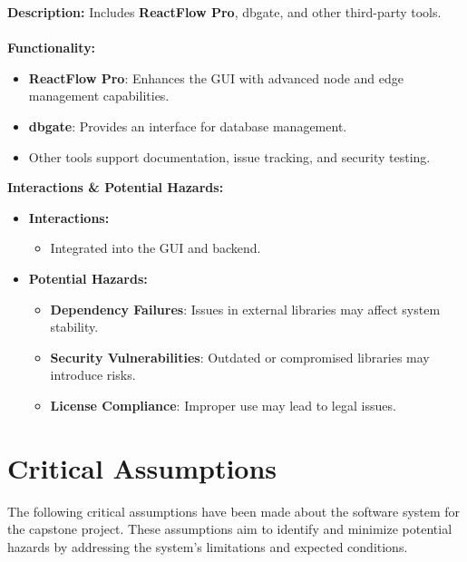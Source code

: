 \documentclass{article}
\begin{document}
\textbf{Description:}
Includes \textbf{ReactFlow Pro}, dbgate, and other third-party tools.
\\\\
\textbf{Functionality:}
\begin{itemize}
    \item \textbf{ReactFlow Pro}: Enhances the GUI with advanced node and edge management capabilities.
    \item \textbf{dbgate}: Provides an interface for database management.
    \item Other tools support documentation, issue tracking, and security testing.
    
\end{itemize}
\textbf{Interactions \& Potential Hazards:}
\begin{itemize}
    \item \textbf{Interactions:}
    \begin{itemize}
        \item Integrated into the GUI and backend.
    \end{itemize}
    \item \textbf{Potential Hazards:}
    \begin{itemize}
        \item \textbf{Dependency Failures}: Issues in external libraries may affect system stability.
        \item \textbf{Security Vulnerabilities}: Outdated or compromised libraries may introduce risks.
        \item \textbf{License Compliance}: Improper use may lead to legal issues.
    \end{itemize}
\end{itemize}

\section{Critical Assumptions}

The following critical assumptions have been made about the software system for the capstone project. These assumptions aim to identify and minimize potential hazards by addressing the system's limitations and expected conditions.
\end{document}
